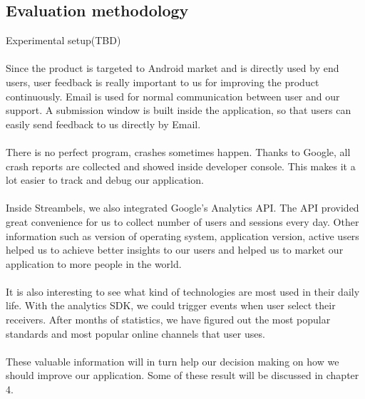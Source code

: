 \subsection{Evaluation methodology}
Experimental setup(TBD)\\
\\
Since the product is targeted to Android market and is directly used by end users, user feedback is really important to us for improving the product continuously. Email is used for normal communication between user and our support. A submission window is built inside the application, so that users can easily send feedback to us directly by Email.\\
\\
There is no perfect program, crashes sometimes happen. Thanks to Google, all crash reports are collected and showed inside developer console. This makes it a lot easier to track and debug our application.\\
\\
Inside Streambels, we also integrated Google's Analytics API. The API provided great convenience for us to collect number of users and sessions every day. Other information such as version of operating system, application version, active users helped us to achieve better insights to our users and helped us to market our application to more
people in the world.\\
\\
It is also interesting to see what kind of technologies are most used in their daily life. With the analytics SDK, we could trigger events when user select their receivers. After months of statistics, we have figured out the most popular standards and most popular online channels that user uses.\\
\\
These valuable information will in turn help our decision making on how we should improve our application. Some of these result will be discussed in chapter 4.